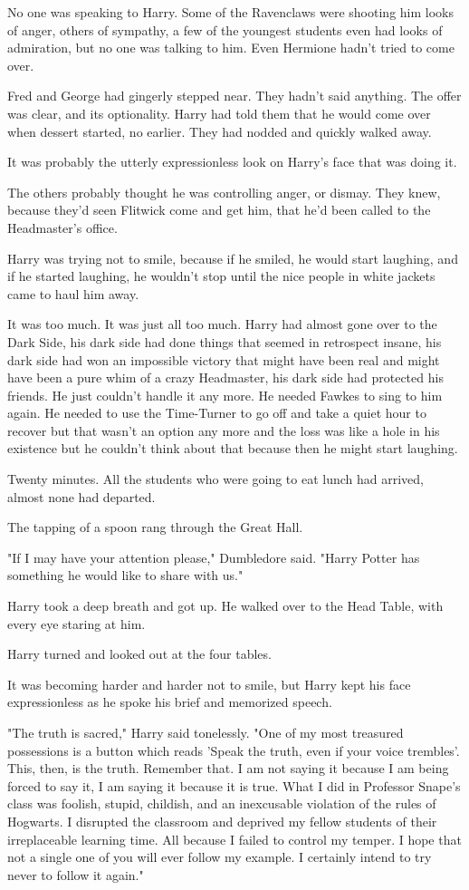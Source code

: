 No one was speaking to Harry. Some of the Ravenclaws were shooting him looks of 
anger, others of sympathy, a few of the youngest students even had looks of 
admiration, but no one was talking to him. Even Hermione hadn't tried to come 
over.

Fred and George had gingerly stepped near. They hadn't said anything. The offer 
was clear, and its optionality. Harry had told them that he would come over 
when dessert started, no earlier. They had nodded and quickly walked away.

It was probably the utterly expressionless look on Harry's face that was doing 
it.

The others probably thought he was controlling anger, or dismay. They knew, 
because they'd seen Flitwick come and get him, that he'd been called to the 
Headmaster's office.

Harry was trying not to smile, because if he smiled, he would start laughing, 
and if he started laughing, he wouldn't stop until the nice people in white 
jackets came to haul him away.

It was too much. It was just all too much. Harry had almost gone over to the 
Dark Side, his dark side had done things that seemed in retrospect insane, his 
dark side had won an impossible victory that might have been real and might 
have been a pure whim of a crazy Headmaster, his dark side had protected his 
friends. He just couldn't handle it any more. He needed Fawkes to sing to him 
again. He needed to use the Time-Turner to go off and take a quiet hour to 
recover but that wasn't an option any more and the loss was like a hole in his 
existence but he couldn't think about that because then he might start laughing.

Twenty minutes. All the students who were going to eat lunch had arrived, 
almost none had departed.

The tapping of a spoon rang through the Great Hall.

"If I may have your attention please," Dumbledore said. "Harry Potter has 
something he would like to share with us."

Harry took a deep breath and got up. He walked over to the Head Table, with 
every eye staring at him.

Harry turned and looked out at the four tables.

It was becoming harder and harder not to smile, but Harry kept his face 
expressionless as he spoke his brief and memorized speech.

"The truth is sacred," Harry said tonelessly. "One of my most treasured 
possessions is a button which reads 'Speak the truth, even if your voice 
trembles'. This, then, is the truth. Remember that. I am not saying it because 
I am being forced to say it, I am saying it because it is true. What I did in 
Professor Snape's class was foolish, stupid, childish, and an inexcusable 
violation of the rules of Hogwarts. I disrupted the classroom and deprived my 
fellow students of their irreplaceable learning time. All because I failed to 
control my temper. I hope that not a single one of you will ever follow my 
example. I certainly intend to try never to follow it again."

